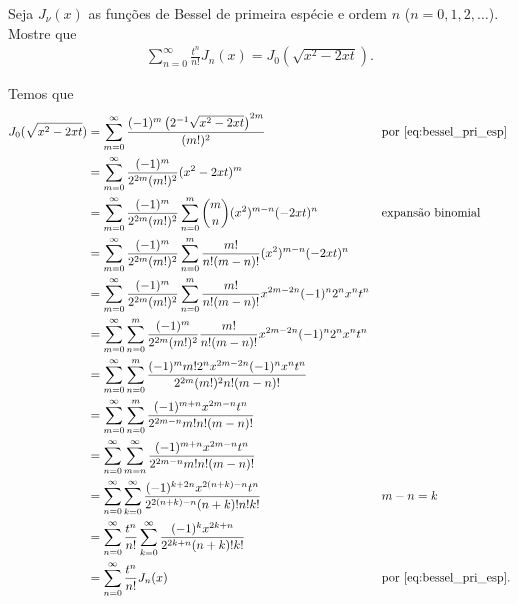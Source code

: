 \documentclass[a4paper,12pt, leqno, answers]{exam}
\begin{document}
\begin{questions}
    \question[P2 de 2011, E de 2011] Seja $J_\nu(x)$ as fun\c{c}\~{o}es de Bessel de primeira esp\'{e}cie e ordem $n$ ($n = 0, 1, 2, \ldots$). Mostre que
    \begin{align*}
        \sum_{n = 0}^\infty \frac{t^n}{n!} J_n(x) = J_0(\sqrt{x^2 - 2xt}).
    \end{align*}
    \begin{solution}
        Temos que
        \begin{align*}
            J_0(\sqrt{x^2 - 2 x t}) &= \sum_{m = 0}^\infty \frac{(-1)^m \left( 2^{-1} \sqrt{x^2 - 2 x t} \right)^{2m}}{(m!)^2} && \text{por \eqref{eq:bessel_pri_esp}} \\
            &= \sum_{m = 0}^\infty \frac{(-1)^m}{2^{2m} (m!)^2} (x^2 - 2x t)^m \\
            &= \sum_{m = 0}^\infty \frac{(-1)^m}{2^{2m} (m!)^2} \sum_{n = 0}^m \binom{m}{n} (x^2)^{m - n} (-2 x t)^n && \text{expans\~{a}o binomial} \\
            &= \sum_{m = 0}^\infty \frac{(-1)^m}{2^{2m} (m!)^2} \sum_{n = 0}^m \frac{m!}{n! (m - n)!} (x^2)^{m - n} (-2 x t)^n \\
            &= \sum_{m = 0}^\infty \frac{(-1)^m}{2^{2m} (m!)^2} \sum_{n = 0}^m \frac{m!}{n! (m - n)!} x^{2m - 2n} (-1)^n 2^n x^n t^n \\
            &= \sum_{m = 0}^\infty \sum_{n = 0}^m \frac{(-1)^m}{2^{2m} (m!)^2} \frac{m!}{n! (m - n)!} x^{2m - 2n} (-1)^n 2^n x^n t^n \\
            &= \sum_{m = 0}^\infty \sum_{n = 0}^m \frac{(-1)^m m! 2^n x^{2m - 2n} (-1)^n x^n t^n}{2^{2m} (m!)^2 n! (m - n)!} \\
            &= \sum_{m = 0}^\infty \sum_{n = 0}^m \frac{(-1)^{m + n} x^{2m - n} t^n}{2^{2m - n} m! n! (m - n)!} \\
            &= \sum_{n = 0}^\infty \sum_{m = n}^\infty \frac{(-1)^{m + n} x^{2m - n} t^n}{2^{2m - n} m! n! (m - n)!} \\
            &= \sum_{n = 0}^\infty \sum_{k = 0}^\infty \frac{(-1)^{k + 2n} x^{2(n + k) - n} t^n}{2^{2(n + k) - n} (n + k)! n! k!} && m - n = k \\
            &= \sum_{n = 0}^\infty \frac{t^n}{n!} \sum_{k = 0}^\infty \frac{(-1)^{k} x^{2k + n}}{2^{2k + n} (n + k)! k!} \\
            &= \sum_{n = 0}^\infty \frac{t^n}{n!} J_n(x) && \text{por \eqref{eq:bessel_pri_esp}}.
        \end{align*}
    \end{solution}
\end{questions}


\end{document}
